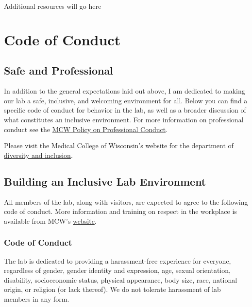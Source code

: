 \documentclass[
]{book}
\begin{document}
Additional resources will go here

\hypertarget{code}{%
\chapter{Code of Conduct}\label{code}}

\hypertarget{safe-and-professional}{%
\section{Safe and Professional}\label{safe-and-professional}}

In addition to the general expectations laid out above, I am dedicated to making our lab a safe, inclusive, and welcoming environment for all. Below you can find a specific code of conduct for behavior in the lab, as well as a broader discussion of what constitutes an inclusive environment. For more information on professional conduct see the \href{https://www.mcw.edu/about-mcw/non-discrimination-notice/mcw-professional-conduct-policy}{MCW Policy on Professional Conduct}.

Please visit the Medical College of Wisconsin's website for the department of \href{https://www.mcw.edu/departments/office-of-diversity-and-inclusion}{diversity and inclusion}.

\hypertarget{building-an-inclusive-lab-environment}{%
\section{Building an Inclusive Lab Environment}\label{building-an-inclusive-lab-environment}}

All members of the lab, along with visitors, are expected to agree to the following code of conduct. More information and training on respect in the workplace is available from MCW's \href{https://www1.mcw.edu/FileLibrary/Groups/FacultyAffairs/NewFacultyForms/NewFaculty-FacultyRespectTrain3.pdf}{website}.

\hypertarget{code-of-conduct}{%
\subsection{Code of Conduct}\label{code-of-conduct}}

The lab is dedicated to providing a harassment-free experience for everyone, regardless of gender, gender identity and expression, age, sexual orientation, disability, socioeconomic status, physical appearance, body size, race, national origin, or religion (or lack thereof). We do not tolerate harassment of lab members in any form.
\end{document}
